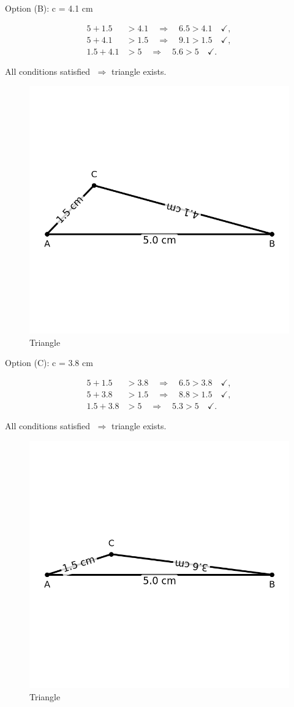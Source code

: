 \documentclass[journal]{IEEEtran}
\begin{document}
Option (B): c = 4.1 cm

\begin{align}
5 + 1.5 &> 4.1 \quad\Rightarrow\quad 6.5 > 4.1\quad\checkmark,\\
5 + 4.1 &> 1.5 \quad\Rightarrow\quad 9.1 > 1.5\quad\checkmark,\\
1.5 + 4.1 &> 5 \quad\Rightarrow\quad 5.6 > 5\quad\checkmark.
\end{align}

All conditions satisfied $\;\Rightarrow$ triangle exists.

\begin{figure}[htbp]
\centering
\includegraphics[width=0.5\columnwidth]{figs/fig2.png}
\caption{Triangle}
\label{fig:figs/fig2.png}
\end{figure}

\bigskip

\newpage

Option (C): c = 3.8 cm

\begin{align}
5 + 1.5 &> 3.8 \quad\Rightarrow\quad 6.5 > 3.8\quad\checkmark,\\
5 + 3.8 &> 1.5 \quad\Rightarrow\quad 8.8 > 1.5\quad\checkmark,\\
1.5 + 3.8 &> 5 \quad\Rightarrow\quad 5.3 > 5\quad\checkmark.
\end{align}

All conditions satisfied $\;\Rightarrow$ triangle exists.

\begin{figure}[htbp]
\centering
\includegraphics[width=0.2\columnwidth]{figs/fig1.png}
\caption{Triangle}
\label{fig:figs/fig3.png}
\end{figure}
\end{document}
